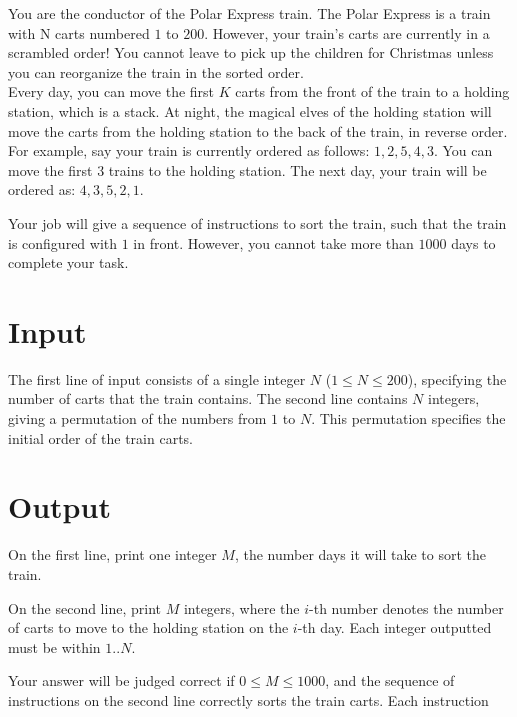 
\noindent You are the conductor of the Polar Express train. The Polar Express is a train with N carts numbered $1$ to $200$. However, your train's carts are currently in a scrambled order! You cannot leave to pick up the children for Christmas unless you can reorganize the train in the sorted order. \\

Every day, you can move the first $K$ carts from the front of the train to a holding station, which is a stack. At night, the magical elves of the holding station will move the carts from the holding station to the back of the train, in reverse order. \\

For example, say your train is currently ordered as follows: $1, 2, 5, 4, 3$. You can move the first 3 trains to the holding station. The next day, your train will be ordered as: $4, 3, 5, 2, 1$.

Your job will give a sequence of instructions to sort the train, such that the train is configured with $1$ in front. However, you cannot take more than $1000$ days to complete your task.\\

\section*{Input}
The first line of input consists of a single integer $N$ ($1 \leq N \leq 200$), specifying the number of carts that the train contains.
The second line contains $N$ integers, giving a permutation of the numbers from $1$ to $N$. This permutation specifies the initial order of the train carts.\\

\section*{Output}
On the first line, print one integer $M$, the number days it will take to sort the train.

On the second line, print $M$ integers, where the $i$-th number denotes the number of carts to move to the holding station on the $i$-th day. Each integer outputted must be within $1 .. N$.

Your answer will be judged correct if $0 \leq M \leq 1000$, and the sequence of instructions on the second line correctly sorts the train carts. Each instruction

